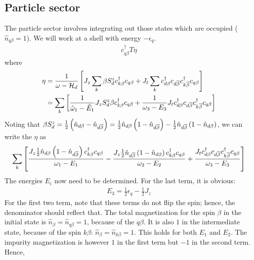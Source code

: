 \documentclass[12pt,twoside]{report}
\numberwithin{equation}{section}
\begin{document}
\subsection{Particle sector}
The particle sector involves integrating out those states which are occupied (\(\hat n_{q\beta}=1\)). We will work at a shell with energy \(-\epsilon_q\).
\begin{equation}\begin{aligned}
	c^\dagger_{q\beta}T \eta
\end{aligned}\end{equation}
where
\begin{equation}\begin{aligned}
	\label{partomega}
	\eta &= \frac{1}{\omega - \mathcal{H}_d} \left[ J_z\sum_k \beta S_d^z c^\dagger_{k\beta}c_{q\beta} + J_t \sum_k c^\dagger_{d\beta}c_{d\overline\beta} c^\dagger_{k\overline\beta}c_{q\beta} \right]\\
	     &=\sum_k \left[\frac{1}{\hat \omega_1 - \hat E_1 } J_z S_d^z \beta c^\dagger_{k\beta}c_{q\beta} + \frac{1}{\omega_3 - E_3}J_t  c^\dagger_{d\beta}c_{d\overline\beta} c^\dagger_{k\overline\beta}c_{q\beta}\right] 
\end{aligned}\end{equation}
Noting that \(\beta S_d^z = \frac{1}{2}\left( \hat n_{d\beta} - \hat n_{d\overline\beta} \right) = \frac{1}{2}\hat n_{d\beta}\left( 1 - \hat n_{d\overline\beta} \right) - \frac{1}{2}\hat n_{d\overline\beta}\left( 1 - \hat n_{d\beta} \right)\), we can write the \(\eta\) as
\begin{equation}\begin{aligned}
	     \sum_k \left[\frac{ J_z \frac{1}{2}\hat n_{d\beta}\left( 1 - \hat n_{d\overline\beta} \right) c^\dagger_{k\beta}c_{q\beta}}{\omega_1 - E_1} - \frac{J_z \frac{1}{2}\hat n_{d\overline\beta}\left( 1 - \hat n_{d\beta} \right) c^\dagger_{k\beta}c_{q\beta}}{\omega_2 - E_2} + \frac{J_t  c^\dagger_{d\beta}c_{d\overline\beta} c^\dagger_{k\overline\beta}c_{q\beta}}{\omega_3 - E_3}\right] 
\end{aligned}\end{equation}
The energies \(E_i\) now need to be determined. For the last term, it is obvious:
\begin{equation}\begin{aligned}
	E_3 = \frac{1}{2}\epsilon_q - \frac{1}{2}J_z
\end{aligned}\end{equation}
For the first two term, note that these terms do not flip the spin; hence, the denominator should reflect that. The total magnetization for the spin \(\beta\) in the initial state is \(\hat n_\beta = \hat n_{q\beta} = 1\), because of the \(q\beta\). It is also \(1\) in the intermediate state, because of the spin \(k\beta\): \(\hat n_\beta = \hat n_{k\beta} = 1\). This holds for both \(E_1\) and \(E_2\). The impurity magnetization is however \(1\) in the first term but \(-1\) in the second term. Hence,
\end{document}
